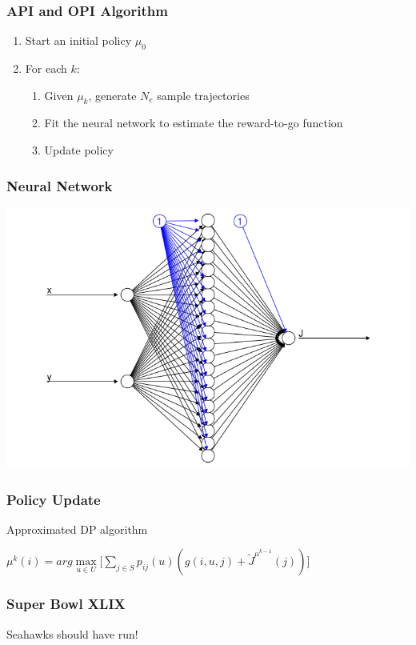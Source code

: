 \documentclass{beamer}
\begin{document}
\begin{frame}
\frametitle{API and OPI Algorithm}
\begin{enumerate}
\item Start an initial policy $\mu_{0}$
\item For each $k$:
\begin{enumerate}
\item Given $\mu_{k}$, generate $N_{e}$ sample trajectories
\item Fit the neural network to estimate the reward-to-go function
\item Update policy
\end{enumerate}
\end{enumerate}
\end{frame}

\begin{frame}
\frametitle{Neural Network}
\includegraphics[scale=0.65]{neuralnet}
\end{frame}

\begin{frame}
\frametitle{Policy Update}
\begin{block}{Approximated DP algorithm}
\begin{center}
$\mu^{k}(i) = arg\max\limits_{u \in U} \Big[ \sum\limits_{j \in S} p_{ij}(u)(g(i,u,j) +  \widetilde{J}^{\mu^{k-1}}(j))\Big]$
\end{center}
\end{block}
\end{frame}

\begin{frame}
\frametitle{Super Bowl XLIX}
\begin{center}
Seahawks should have run!
\end{center}
\end{frame}
\end{document}
